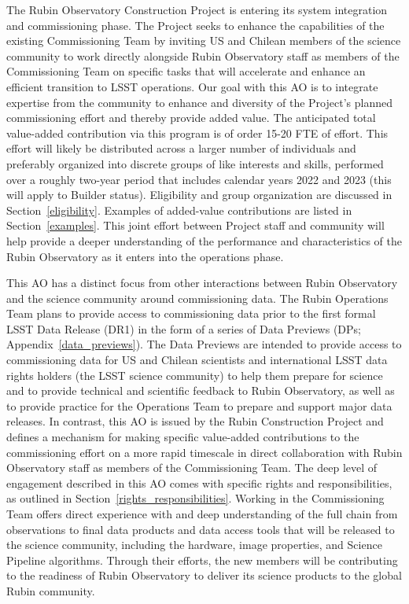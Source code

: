 \documentclass[SE,authoryear,toc]{lsstdoc}
\begin{document}
The Rubin Observatory Construction Project is entering its system integration and commissioning phase. The Project seeks to enhance the capabilities of the existing Commissioning Team by inviting US and Chilean members of the science community to work directly alongside Rubin Observatory staff as members of the Commissioning Team on specific tasks that will accelerate and enhance an efficient transition to LSST operations. Our goal with this AO is to integrate expertise from the community to enhance and diversity of the Project's planned commissioning effort and thereby provide added value. The anticipated total value-added contribution via this program is of order 15-20 FTE of effort. This effort will likely be distributed across a larger number of individuals and preferably organized into discrete groups of like interests and skills, performed over a roughly two-year period that includes calendar years 2022 and 2023 (this will apply to Builder status). Eligibility and group organization are discussed in Section~\ref{eligibility}. Examples of added-value contributions are listed in Section~\ref{examples}. This joint effort between Project staff and community will help provide a deeper understanding of the performance and characteristics of the Rubin Observatory as it enters into the operations phase.

This AO has a distinct focus from other interactions between Rubin Observatory and the science community around commissioning data. The Rubin Operations Team plans to provide access to commissioning data prior to the first formal LSST Data Release (DR1) in the form of a series of Data Previews (DPs; Appendix~\ref{data_previews}). The Data Previews are intended to provide access to commissioning data for US and Chilean scientists and international LSST data rights holders (the LSST science community) to help them prepare for science and to provide technical and scientific feedback to Rubin Observatory, as well as to provide practice for the Operations Team to prepare and support major data releases. In contrast, this AO is issued by the Rubin Construction Project and defines a mechanism for making specific value-added contributions to the commissioning effort on a more rapid timescale in direct collaboration with Rubin Observatory staff as members of the Commissioning Team. The deep level of engagement described in this AO comes with specific rights and responsibilities, as outlined in Section~\ref{rights_responsibilities}. Working in the Commissioning Team offers direct experience with and deep understanding of the full chain from observations to final data products and data access tools that will be released to the science community, including the hardware, image properties, and Science Pipeline algorithms. Through their efforts, the new members will be contributing to the readiness of Rubin Observatory to deliver its science products to the global Rubin community. 
\end{document}
